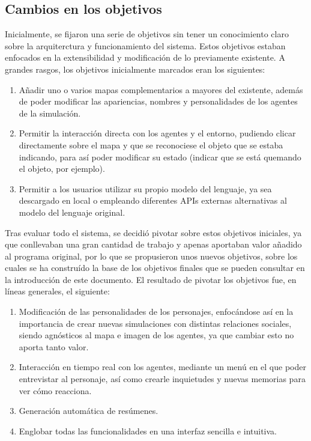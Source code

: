 \subsection{Cambios en los objetivos}

Inicialmente, se fijaron una serie de objetivos sin tener un conocimiento claro sobre la arquiterctura y funcionamiento del sistema. Estos objetivos estaban enfocados en la extensibilidad y modificación de lo previamente existente. A grandes rasgos, los objetivos inicialmente marcados eran los siguientes:

\begin{enumerate}
	\item Añadir uno o varios mapas complementarios a mayores del existente, además de poder modificar las apariencias, nombres y personalidades de los agentes de la simulación.
	
	\item Permitir la interacción directa con los agentes y el entorno, pudiendo clicar directamente sobre el mapa y que se reconociese el objeto que se estaba indicando, para así poder modificar su estado (indicar que se está quemando el objeto, por ejemplo).
	
	\item Permitir a los usuarios utilizar su propio modelo del lenguaje, ya sea descargado en local o empleando diferentes APIs externas alternativas al modelo del lenguaje original.
\end{enumerate}

Tras evaluar todo el sistema, se decidió pivotar sobre estos objetivos iniciales, ya que conllevaban una gran cantidad de trabajo y apenas aportaban valor añadido al programa original, por lo que se propusieron unos nuevos objetivos, sobre los cuales se ha construído la base de los objetivos finales que se pueden consultar en la introducción de este documento. El resultado de pivotar los objetivos fue, en líneas generales, el siguiente:

\begin{enumerate}
	\item Modificación de las personalidades de los personajes, enfocándose así en la importancia de crear nuevas simulaciones con distintas relaciones sociales, siendo agnósticos al mapa e imagen de los agentes, ya que cambiar esto no aporta tanto valor.
	
	\item Interacción en tiempo real con los agentes, mediante un menú en el que poder entrevistar al personaje, así como crearle inquietudes y nuevas memorias para ver cómo reacciona.
	
	\item Generación automática de resúmenes.
	
	\item Englobar todas las funcionalidades en una interfaz sencilla e intuitiva.
\end{enumerate}

